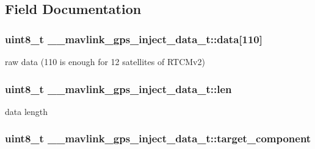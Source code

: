 \subsection{Field Documentation}
\hypertarget{struct____mavlink__gps__inject__data__t_ab5db3083e64a4230a5fe35e294839917}{
\subsubsection[{data}]{\setlength{\rightskip}{0pt plus 5cm}uint8\+\_\+t \+\_\+\+\_\+mavlink\+\_\+gps\+\_\+inject\+\_\+data\+\_\+t\+::data\mbox{[}110\mbox{]}}}\label{struct____mavlink__gps__inject__data__t_ab5db3083e64a4230a5fe35e294839917}


raw data (110 is enough for 12 satellites of R\+T\+C\+Mv2) 

\hypertarget{struct____mavlink__gps__inject__data__t_aeabfb472265f0ed7adfcb7c8342f5d54}{
\subsubsection[{len}]{\setlength{\rightskip}{0pt plus 5cm}uint8\+\_\+t \+\_\+\+\_\+mavlink\+\_\+gps\+\_\+inject\+\_\+data\+\_\+t\+::len}}\label{struct____mavlink__gps__inject__data__t_aeabfb472265f0ed7adfcb7c8342f5d54}


data length 

\hypertarget{struct____mavlink__gps__inject__data__t_aec0e9b93bbff7fd56b7cef3c18ad3e0c}{
\subsubsection[{target\+\_\+component}]{\setlength{\rightskip}{0pt plus 5cm}uint8\+\_\+t \+\_\+\+\_\+mavlink\+\_\+gps\+\_\+inject\+\_\+data\+\_\+t\+::target\+\_\+component}}\label{struct____mavlink__gps__inject__data__t_aec0e9b93bbff7fd56b7cef3c18ad3e0c}


